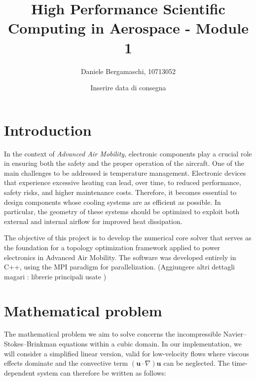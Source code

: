 \documentclass[12pt]{article}
\title{High Performance Scientific Computing in Aerospace - Module 1}
\author{Daniele Bergamaschi, 10713052}
\date{Inserire data di consegna}
\begin{document}
\vspace*{8cm}

\maketitle

\thispagestyle{empty}

\vspace*{3cm}
\section{Introduction}

In the context of \textit{Advanced Air Mobility}, electronic components play a crucial role in ensuring both the safety and the proper operation of the aircraft. One of the main challenges to be addressed is temperature management. Electronic devices that experience excessive heating can lead, over time, to reduced performance, safety risks, and higher maintenance costs. 
Therefore, it becomes essential to design components whose cooling systems are as efficient as possible. In particular, the geometry of these systems should be optimized to exploit both external and internal airflow for improved heat dissipation.

The objective of this project is to develop the numerical core solver that serves as the foundation for a topology optimization framework applied to power electronics in Advanced Air Mobility.
The software was developed entirely in C++, using the MPI paradigm for parallelization. 
(Aggiungere altri dettagli magari : librerie principali usate ) 

\newpage
\section{Mathematical problem}

The mathematical problem we aim to solve concerns the incompressible Navier--Stokes--Brinkman equations within a cubic domain. 
In our implementation, we will consider a simplified linear version, valid for low-velocity flows where viscous effects dominate and the convective term $(\mathbf{u} \cdot \nabla) \mathbf{u}$ can be neglected. 
The time-dependent system can therefore be written as follows:
\end{document}
